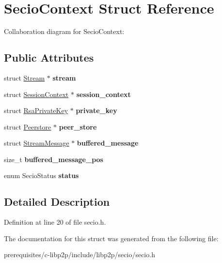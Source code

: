 \hypertarget{struct_secio_context}{}\section{Secio\+Context Struct Reference}
\label{struct_secio_context}


Collaboration diagram for Secio\+Context\+:
\subsection*{Public Attributes}
\begin{DoxyCompactItemize}
\item 
\mbox{\label{struct_secio_context_aa7b5949f36f7cdfe8fca89821d8606a8}} 
struct \mbox{\hyperlink{struct_stream}{Stream}} $\ast$ {\bfseries stream}
\item 
\mbox{\label{struct_secio_context_a8984a335318cc396f7f1db843e171f48}} 
struct \mbox{\hyperlink{struct_session_context}{Session\+Context}} $\ast$ {\bfseries session\+\_\+context}
\item 
\mbox{\label{struct_secio_context_a07104f9b4ce1e26257dbbddf4af1c5c4}} 
struct \mbox{\hyperlink{struct_rsa_private_key}{Rsa\+Private\+Key}} $\ast$ {\bfseries private\+\_\+key}
\item 
\mbox{\label{struct_secio_context_a5911d278c88a5602b6746c82632bfbcb}} 
struct \mbox{\hyperlink{struct_peerstore}{Peerstore}} $\ast$ {\bfseries peer\+\_\+store}
\item 
\mbox{\label{struct_secio_context_a0b8869448916ed0294fabab3c3e90fce}} 
struct \mbox{\hyperlink{struct_stream_message}{Stream\+Message}} $\ast$ {\bfseries buffered\+\_\+message}
\item 
\mbox{\label{struct_secio_context_a7e450d26c5cdad8e9a1d39d956b43ba6}} 
size\+\_\+t {\bfseries buffered\+\_\+message\+\_\+pos}
\item 
\mbox{\label{struct_secio_context_a2d7d64130ae83d93401b1108ca766e4b}} 
enum Secio\+Status {\bfseries status}
\end{DoxyCompactItemize}


\subsection{Detailed Description}


Definition at line 20 of file secio.\+h.



The documentation for this struct was generated from the following file\+:\begin{DoxyCompactItemize}
\item 
prerequisites/c-\/libp2p/include/libp2p/secio/secio.\+h\end{DoxyCompactItemize}
